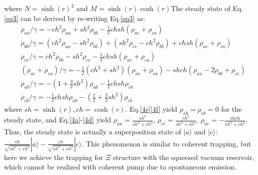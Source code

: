 \documentclass[aps,showpacs,onecolumn,twoside,groupedaddress]{revtex4}
\begin{document}
where $N=\sinh(r)^2$ and $M=\sinh(r)\cosh(r)$The steady state of Eq.\eqref{eq3} can be derived by re-writing Eq.\eqref{eq3} as:
\begin{subequations}
\begin{align}
&\dot{\rho}_{aa}/\gamma=-ch^{2}\rho_{aa}+sh{}^{2}\rho_{bb}-\frac{1}{2}chsh(\rho_{ac}+\rho_{ca})\label{4a} \\
& \dot{\rho}_{bb}/\gamma=(ch^{2}\rho_{aa}-sh^{2}\rho_{bb})+(sh^{2}\rho_{cc}-ch^{2}\rho_{bb})+chsh(\rho_{ac}+\rho_{ca})\label{4b}\\
&\dot{\rho}_{cc}/\gamma=ch^{2}\rho_{bb}-sh^{2}\rho_{cc}-\frac{1}{2}chsh(\rho_{ac}+\rho_{ca})\label{4c}\\
&(\dot{\rho}_{ac}+\dot{\rho}_{ca})/\gamma=-\frac{1}{2}(ch^{2}+sh^{2})(\rho_{ac}+\rho_{ca})-shch(\rho_{aa}-2\rho_{bb}+\rho_{cc})\label{4d}\\
&\dot{\rho}_{ab}/\gamma=-(1+\frac{3}{2}sh^{2})\rho_{ab}-\frac{1}{2}chsh\rho_{cb}\label{4e}\\
&\dot{\rho}_{cb}/\gamma=-\frac{1}{2}chsh\rho_{ab}-(\frac{1}{2}+\frac{3}{2}sh^{2})\rho_{cb}\label{4f}
\end{align}
\end{subequations}
where $sh=\sinh(r), ch=\cosh(r)$. Eq.\eqref{4e}\eqref{4f} yield $\rho_{ab}=\rho_{cb}=0$ for the steady state, and Eq.\eqref{4a}-\eqref{4d} yield $\rho_{aa}=\frac{sh^{2}}{sh^{2}+ch^{2}}$, $\rho_{cc}=\frac{ch^{2}}{sh^{2}+ch^{2}}$, $\rho_{ac}=-\frac{shch}{sh^{2}+ch^{2}}$. Thus, the steady state is actually a superposition state of $|a\rangle$ and $|c\rangle$: $\frac{sh}{\sqrt{sh^{2}+ch^{2}}}|a\rangle-\frac{ch}{\sqrt{sh^{2}+ch^{2}}}|c\rangle$. This phenomenon is similar to coherent trapping, but here we achieve the trapping for $\Xi$ structure with the squeezed vacuum reservoir, which cannot be realized with coherent pump due to spontaneous emission.
\end{document}

